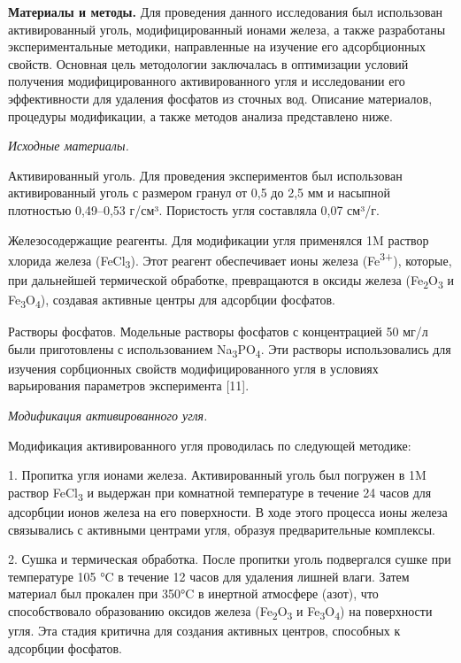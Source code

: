 {\bfseries Материалы и методы.} Для проведения данного исследования был
использован активированный уголь, модифицированный ионами железа, а
также разработаны экспериментальные методики, направленные на изучение
его адсорбционных свойств. Основная цель методологии заключалась в
оптимизации условий получения модифицированного активированного угля и
исследовании его эффективности для удаления фосфатов из сточных вод.
Описание материалов, процедуры модификации, а также методов анализа
представлено ниже.

\emph{Исходные материалы.}

Активированный уголь. Для проведения экспериментов был использован
активированный уголь с размером гранул от 0,5 до 2,5 мм и насыпной
плотностью 0,49--0,53 г/см³. Пористость угля составляла 0,07 см³/г.

Железосодержащие реагенты. Для модификации угля применялся 1M раствор
хлорида железа (FeCl\textsubscript{3}). Этот реагент обеспечивает ионы
железа (Fe\textsuperscript{3+}), которые, при дальнейшей термической
обработке, превращаются в оксиды железа
(Fe\textsubscript{2}O\textsubscript{3} и
Fe\textsubscript{3}O\textsubscript{4}), создавая активные центры для
адсорбции фосфатов.

Растворы фосфатов. Модельные растворы фосфатов с концентрацией 50 мг/л
были приготовлены с использованием
Na\textsubscript{3}PO\textsubscript{4}. Эти растворы использовались для
изучения сорбционных свойств модифицированного угля в условиях
варьирования параметров эксперимента {[}11{]}.

\emph{Модификация активированного угля.}

Модификация активированного угля проводилась по следующей методике:

1. Пропитка угля ионами железа. Активированный уголь был погружен в 1M
раствор FeCl\textsubscript{3} и выдержан при комнатной температуре в
течение 24 часов для адсорбции ионов железа на его поверхности. В ходе
этого процесса ионы железа связывались с активными центрами угля,
образуя предварительные комплексы.

2. Сушка и термическая обработка. После пропитки уголь подвергался сушке
при температуре 105 °C в течение 12 часов для удаления лишней влаги.
Затем материал был прокален при 350°C в инертной атмосфере (азот), что
способствовало образованию оксидов железа
(Fe\textsubscript{2}O\textsubscript{3} и
Fe\textsubscript{3}O\textsubscript{4}) на поверхности угля. Эта стадия
критична для создания активных центров, способных к адсорбции фосфатов.


